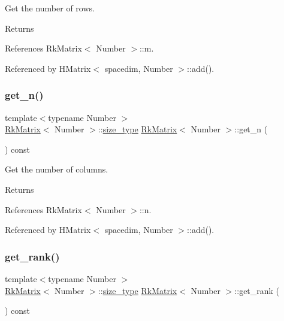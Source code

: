 Get the number of rows. \begin{DoxyReturn}{Returns}

\end{DoxyReturn}


References Rk\+Matrix$<$ Number $>$\+::m.



Referenced by H\+Matrix$<$ spacedim, Number $>$\+::add().

\mbox{\label{classRkMatrix_a4f719c760482c2ab75cc5647277a9cdd}} 
\subsubsection{\texorpdfstring{get\+\_\+n()}{get\_n()}}
{\footnotesize\ttfamily template$<$typename Number $>$ \\
\hyperlink{classRkMatrix}{Rk\+Matrix}$<$ Number $>$\+::\hyperlink{classRkMatrix_add060bfc3a4cc77f858c3d6dd58cadd5}{size\+\_\+type} \hyperlink{classRkMatrix}{Rk\+Matrix}$<$ Number $>$\+::get\+\_\+n (\begin{DoxyParamCaption}{ }\end{DoxyParamCaption}) const}

Get the number of columns. \begin{DoxyReturn}{Returns}

\end{DoxyReturn}


References Rk\+Matrix$<$ Number $>$\+::n.



Referenced by H\+Matrix$<$ spacedim, Number $>$\+::add().

\mbox{\label{classRkMatrix_a1b2231c1e02862c91f4451e2b0a5fab4}} 
\subsubsection{\texorpdfstring{get\+\_\+rank()}{get\_rank()}}
{\footnotesize\ttfamily template$<$typename Number $>$ \\
\hyperlink{classRkMatrix}{Rk\+Matrix}$<$ Number $>$\+::\hyperlink{classRkMatrix_add060bfc3a4cc77f858c3d6dd58cadd5}{size\+\_\+type} \hyperlink{classRkMatrix}{Rk\+Matrix}$<$ Number $>$\+::get\+\_\+rank (\begin{DoxyParamCaption}{ }\end{DoxyParamCaption}) const}

